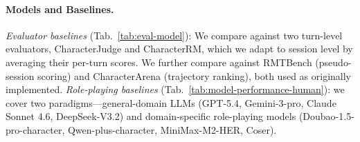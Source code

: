 

\paragraph{Models and Baselines.}
\textit{Evaluator baselines} (Tab.~\ref{tab:eval-model}): 
We compare against two turn-level evaluators, CharacterJudge and CharacterRM, which we adapt to session level by averaging their per-turn scores. We further compare against RMTBench (pseudo-session scoring) and CharacterArena (trajectory ranking), both used as originally implemented.
\textit{Role-playing baselines} (Tab.~\ref{tab:model-performance-human}): we cover two paradigms—general-domain LLMs (GPT-5.4, Gemini-3-pro, Claude Sonnet 4.6, DeepSeek-V3.2) and domain-specific role-playing models (Doubao-1.5-pro-character, Qwen-plus-character, MiniMax-M2-HER, Coser).



